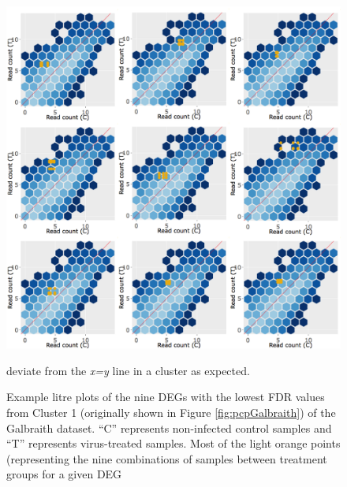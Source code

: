 \documentclass[11pt,a4paper,oldfontcommands,openany]{memoir}
\numberwithin{equation}{section} %
\begin{document}
\begin{figure}[H]
  \includegraphics[width=\textwidth]{Images/litreCluster2}
  \caption{Example litre plots of the nine DEGs with the lowest FDR values from Cluster 1 (originally shown in Figure \ref{fig:pcpGalbraith}) of the Galbraith dataset. ``C'' represents non-infected control samples and ``T'' represents virus-treated samples. Most of the light orange points (representing the nine combinations of samples between treatment groups for a given DEG} deviate from the \textit{x=y} line in a cluster as expected.
  \label{fig:litreCluster2}
\end{figure}
\end{document}
